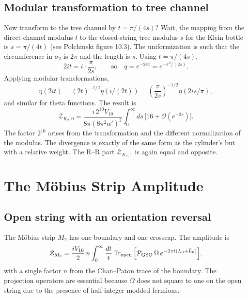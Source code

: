 \documentclass[11pt,a4paper]{article}
\begin{document}
\subsection{Modular transformation to tree channel}
Now transform to the tree channel by $t = \pi/(4s)$? Wait, the mapping from the direct channel modulus $t$ to the closed-string tree modulus $s$ for the Klein bottle is $s = \pi/(4t)$ (see Polchinski figure 10.3). The uniformization is such that the circumference in $\sigma_2$ is $2\pi$ and the length is $s$. Using $t = \pi/(4s)$,
\begin{equation}
2it = i \cdot \frac{\pi}{2s}, \qquad \text{so} \quad q = e^{-2\pi t} = e^{-\pi^2/(2s)}.
\end{equation}
Applying modular transformations,
\begin{equation}
\eta(2it) = (2t)^{-1/2} \eta(i/(2t)) = \left( \frac{\pi}{2s} \right)^{-1/2} \eta(2is/\pi),
\end{equation}
and similar for theta functions. The result is
\begin{equation}
\mathcal{Z}_{K_2,0} = \frac{i\, 2^{10} V_{10}}{8\pi (8\pi^2\alpha')^5} \int_0^\infty ds \, \big[ 16 + \mathcal{O}(e^{-2s}) \big].
\label{eq:ZK20}
\end{equation}
The factor $2^{10}$ arises from the transformation and the different normalization of the modulus. The divergence is exactly of the same form as the cylinder's but with a relative weight. The R–R part $\mathcal{Z}_{K_2,1}$ is again equal and opposite.

\section{The M\"obius Strip Amplitude}
\subsection{Open string with an orientation reversal}
The M\"obius strip $M_2$ has one boundary and one crosscap. The amplitude is
\begin{equation}
\mathcal{Z}_{M_2} = \frac{i V_{10}}{2} \, n \int_0^\infty \frac{dt}{t} \Tr_{\mathrm{open}} \Big[ \mathcal{P}_{\mathrm{GSO}} \, \Omega \, e^{-2\pi t (L_0 + \tilde L_0)} \Big],
\end{equation}
with a single factor $n$ from the Chan–Paton trace of the boundary. The projection operators are essential because $\Omega$ does not square to one on the open string due to the presence of half-integer modded fermions.
\end{document}
